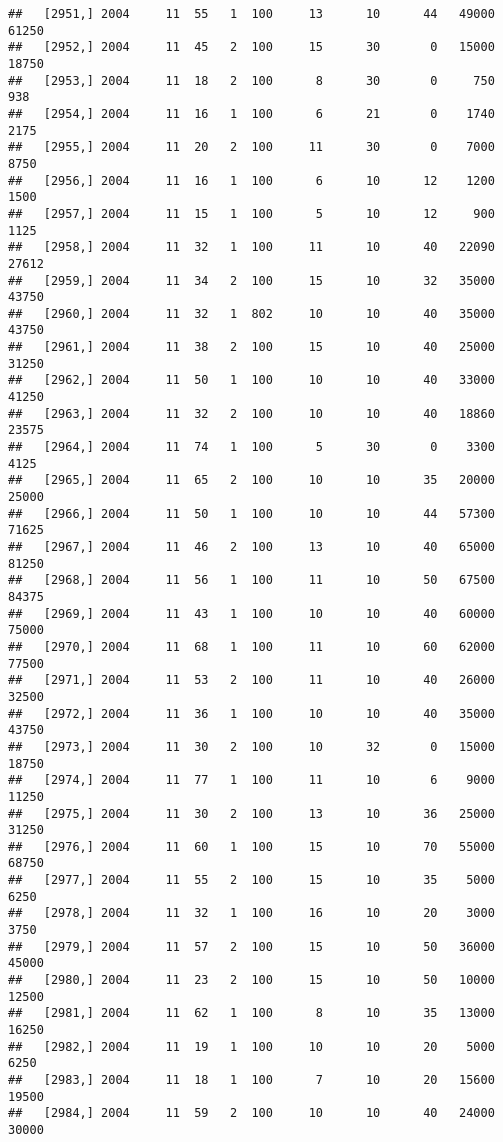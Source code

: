 \documentclass{article}\usepackage[]{graphicx}\usepackage[]{color}
\makeatletter
\newenvironment{kframe}{%
 \def\at@end@of@kframe{}%
 \ifinner\ifhmode%
  \def\at@end@of@kframe{\end{minipage}}%
  \begin{minipage}{\columnwidth}%
 \fi\fi%
 \def\FrameCommand##1{\hskip\@totalleftmargin \hskip-\fboxsep
 \colorbox{shadecolor}{##1}\hskip-\fboxsep
     \hskip-\linewidth \hskip-\@totalleftmargin \hskip\columnwidth}%
 \MakeFramed {\advance\hsize-\width
   \@totalleftmargin\z@ \linewidth\hsize
   \@setminipage}}%
 {\par\unskip\endMakeFramed%
 \at@end@of@kframe}
\newenvironment{knitrout}{}{} %
\makeatother
\begin{document}
\begin{knitrout}
\begin{kframe}
\begin{verbatim}
##   [2951,] 2004     11  55   1  100     13      10      44   49000   61250
##   [2952,] 2004     11  45   2  100     15      30       0   15000   18750
##   [2953,] 2004     11  18   2  100      8      30       0     750     938
##   [2954,] 2004     11  16   1  100      6      21       0    1740    2175
##   [2955,] 2004     11  20   2  100     11      30       0    7000    8750
##   [2956,] 2004     11  16   1  100      6      10      12    1200    1500
##   [2957,] 2004     11  15   1  100      5      10      12     900    1125
##   [2958,] 2004     11  32   1  100     11      10      40   22090   27612
##   [2959,] 2004     11  34   2  100     15      10      32   35000   43750
##   [2960,] 2004     11  32   1  802     10      10      40   35000   43750
##   [2961,] 2004     11  38   2  100     15      10      40   25000   31250
##   [2962,] 2004     11  50   1  100     10      10      40   33000   41250
##   [2963,] 2004     11  32   2  100     10      10      40   18860   23575
##   [2964,] 2004     11  74   1  100      5      30       0    3300    4125
##   [2965,] 2004     11  65   2  100     10      10      35   20000   25000
##   [2966,] 2004     11  50   1  100     10      10      44   57300   71625
##   [2967,] 2004     11  46   2  100     13      10      40   65000   81250
##   [2968,] 2004     11  56   1  100     11      10      50   67500   84375
##   [2969,] 2004     11  43   1  100     10      10      40   60000   75000
##   [2970,] 2004     11  68   1  100     11      10      60   62000   77500
##   [2971,] 2004     11  53   2  100     11      10      40   26000   32500
##   [2972,] 2004     11  36   1  100     10      10      40   35000   43750
##   [2973,] 2004     11  30   2  100     10      32       0   15000   18750
##   [2974,] 2004     11  77   1  100     11      10       6    9000   11250
##   [2975,] 2004     11  30   2  100     13      10      36   25000   31250
##   [2976,] 2004     11  60   1  100     15      10      70   55000   68750
##   [2977,] 2004     11  55   2  100     15      10      35    5000    6250
##   [2978,] 2004     11  32   1  100     16      10      20    3000    3750
##   [2979,] 2004     11  57   2  100     15      10      50   36000   45000
##   [2980,] 2004     11  23   2  100     15      10      50   10000   12500
##   [2981,] 2004     11  62   1  100      8      10      35   13000   16250
##   [2982,] 2004     11  19   1  100     10      10      20    5000    6250
##   [2983,] 2004     11  18   1  100      7      10      20   15600   19500
##   [2984,] 2004     11  59   2  100     10      10      40   24000   30000

\end{verbatim}
\end{kframe}
\end{knitrout}
\end{document}
